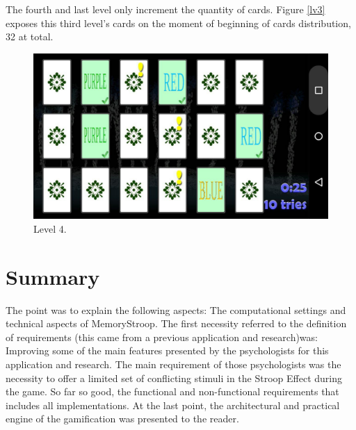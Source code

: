 The fourth and last level only increment the quantity of cards. Figure \ref{lv3} exposes this third level's cards on the moment of beginning of cards distribution, 32 at total.

						\begin{figure}[htp]
							\begin{center}
								\includegraphics[scale=0.25]{chapters/desenvolvimento/img/memorystroop4.jpg}
								\caption{Level 4.}
								\label{lv4}
							\end{center}
						\end{figure}


\section{Summary}
		
The point was to explain the following aspects: The computational settings and technical aspects of MemoryStroop. The first necessity referred to the definition of requirements (this came from a previous application and research)was: \citep{Villa} Improving some of the main features presented by the psychologists for this application and research. The main requirement of those psychologists was the necessity to offer a limited set of conflicting stimuli in the Stroop Effect during the game. So far so good, the functional and non-functional  requirements that includes all implementations.  At the last point, the architectural and practical engine of the gamification was presented to the reader.